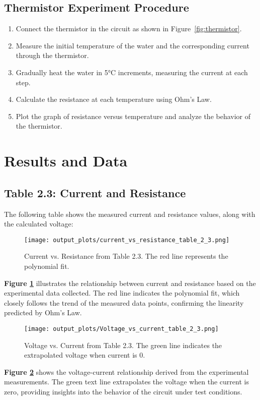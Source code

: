 \documentclass[journal]{IEEEtran}
\begin{document}
\subsection{Thermistor Experiment Procedure}
\begin{enumerate}
    \item Connect the thermistor in the circuit as shown in Figure~\ref{fig:thermistor}.
    \item Measure the initial temperature of the water and the corresponding current through the thermistor.
    \item Gradually heat the water in 5°C increments, measuring the current at each step.
    \item Calculate the resistance at each temperature using Ohm’s Law.
    \item Plot the graph of resistance versus temperature and analyze the behavior of the thermistor.
\end{enumerate}
\section{Results and Data}

\subsection{Table 2.3: Current and Resistance}
The following table shows the measured current and resistance values, along with the calculated voltage:



\begin{figure}[H]
    \centering
    \texttt{[image: output\_plots/current\_vs\_resistance\_table\_2\_3.png]}
    \caption{Current vs. Resistance from Table 2.3\cite{lab_manual}. The red line represents the polynomial fit.}
    \label{fig:current_vs_resistance}
\end{figure}
\textbf{Figure \ref{fig:current_vs_resistance}} illustrates the relationship between current and resistance based on the experimental data collected. The red line indicates the polynomial fit, which closely follows the trend of the measured data points, confirming the linearity predicted by Ohm’s Law.

\begin{figure}[H]
    \centering
    \texttt{[image: output\_plots/Voltage\_vs\_current\_table\_2\_3.png]}
    \caption{Voltage vs. Current from Table 2.3. The green line indicates the extrapolated voltage when current is 0.}
    \label{fig:voltage_vs_current}
\end{figure}
\textbf{Figure \ref{fig:voltage_vs_current}} shows the voltage-current relationship derived from the experimental measurements. The green text line extrapolates the voltage when the current is zero, providing insights into the behavior of the circuit under test conditions.
\end{document}
